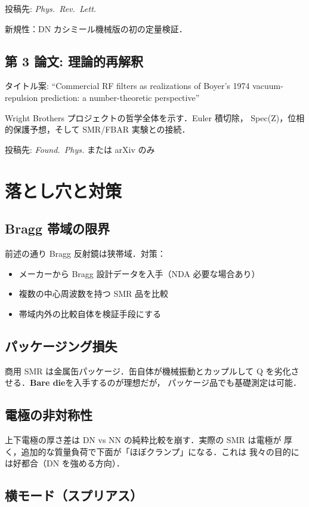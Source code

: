 \documentclass[11pt,a4paper]{article}
\begin{document}
投稿先: \textit{Phys.\ Rev.\ Lett.}

新規性：DN カシミール機械版の初の定量検証．

\subsection{第 3 論文: 理論的再解釈}

タイトル案: ``Commercial RF filters as realizations of Boyer's
1974 vacuum-repulsion prediction: a number-theoretic perspective''

Wright Brothers プロジェクトの哲学全体を示す．Euler 積切除，
Spec(Z)，位相的保護予想，そして SMR/FBAR 実験との接続．

投稿先: \textit{Found.\ Phys.} または arXiv のみ

\section{落とし穴と対策}

\subsection{Bragg 帯域の限界}

前述の通り Bragg 反射鏡は狭帯域．対策：
\begin{itemize}
\item メーカーから Bragg 設計データを入手（NDA 必要な場合あり）
\item 複数の中心周波数を持つ SMR 品を比較
\item 帯域内外の比較自体を検証手段にする
\end{itemize}

\subsection{パッケージング損失}

商用 SMR は金属缶パッケージ．缶自体が機械振動とカップルして
Q を劣化させる．\textbf{Bare die}を入手するのが理想だが，
パッケージ品でも基礎測定は可能．

\subsection{電極の非対称性}

上下電極の厚さ差は DN vs NN の純粋比較を崩す．実際の SMR は電極が
厚く，追加的な質量負荷で下面が「ほぼクランプ」になる．これは
我々の目的には好都合（DN を強める方向）．

\subsection{横モード（スプリアス）}
\end{document}
